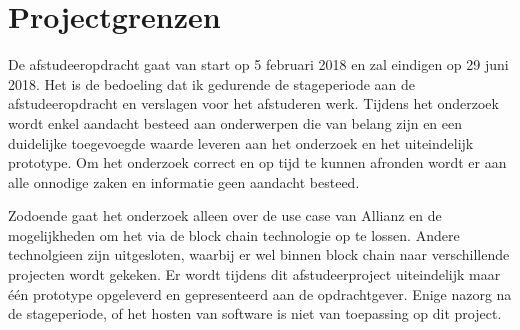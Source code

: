 \chapter{Projectgrenzen}
De afstudeeropdracht gaat van start op 5 februari 2018 en zal eindigen op 29 juni 2018. Het is de bedoeling dat ik gedurende de stageperiode aan de afstudeeropdracht en verslagen voor het afstuderen werk. Tijdens het onderzoek wordt enkel aandacht besteed aan onderwerpen die van belang zijn en een duidelijke toegevoegde waarde leveren aan het onderzoek en het uiteindelijk prototype. Om het onderzoek correct en op tijd te kunnen afronden wordt er aan alle onnodige zaken en informatie geen aandacht besteed.

Zodoende gaat het onderzoek alleen over de use case van Allianz en de mogelijkheden om het via de block chain technologie op te lossen. Andere technolgieen zijn uitgesloten, waarbij er wel binnen block chain naar verschillende projecten wordt gekeken. Er wordt tijdens dit afstudeerproject uiteindelijk maar één prototype opgeleverd en gepresenteerd aan de opdrachtgever. Enige nazorg na de stageperiode, of het hosten van software is niet van toepassing op dit project.